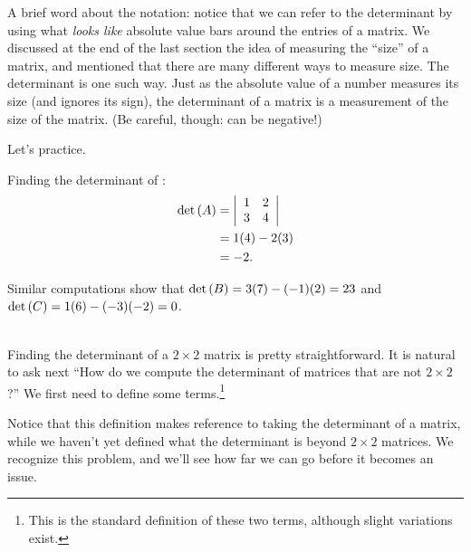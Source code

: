 A brief word about the notation: notice that we can refer to the determinant by using what \textit{looks like} absolute value bars around the entries of a matrix. We discussed at the end of the last section the idea of measuring the ``size'' of a matrix, and mentioned that there are many different ways to measure size. The determinant is one such way. Just as the absolute value of a number measures its size (and ignores its sign), the determinant of a matrix is a measurement of the size of the matrix. (Be careful, though: \det{\tta} can be negative!)

Let's practice.\\

{Finding the determinant of \tta:
\begin{align*}
\det{\tta} &= \bdt{cc}1&2\\3&4\edt \\
						&= 1(4) - 2(3)\\
						&= -2.
\end{align*}

Similar computations show that $\det{\ttb} = 3(7)- (-1)(2) = 23$ and $\det{\ttc} = 1(6) - (-3)(-2) = 0$.}\\ %

Finding the determinant of a $2\times2$ matrix is pretty straightforward. It is natural to ask next ``How do we compute the determinant of matrices that are not $2\times2$?'' We first need to define some terms.\footnote{This is the standard definition of these two terms, although slight variations exist.}

Notice that this definition makes reference to taking the determinant of a matrix, while we haven't yet defined what the determinant is beyond $2\times 2$ matrices. We recognize this problem, and we'll see how far we can go before it becomes an issue.

